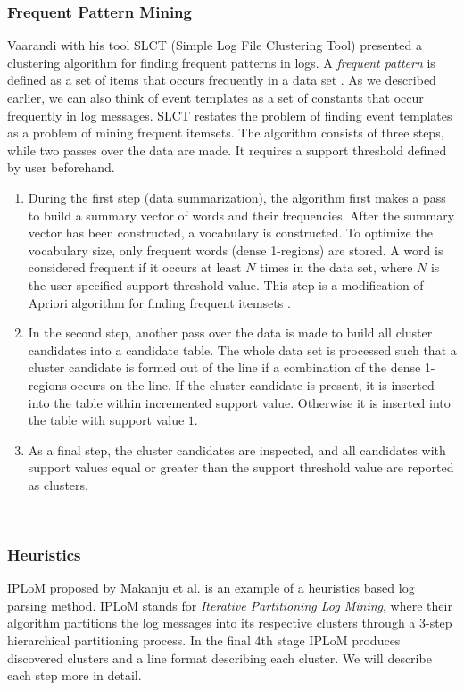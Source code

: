     \subsubsection*{Frequent Pattern Mining} 
    Vaarandi with his tool SLCT (Simple Log File Clustering Tool) \cite{vaarandi2003} presented a clustering algorithm for finding frequent patterns in logs. A \textit{frequent pattern} is defined as a set of items that occurs frequently in a data set \cite{zhlhxzl2018}. As we described earlier, we can also think of event templates as a set of constants that occur frequently in log messages. SLCT restates the problem of finding event templates as a problem of mining frequent itemsets. The algorithm consists of three steps, while two passes over the data are made. It requires a support threshold defined by user beforehand.
   
    \begin{enumerate}
       \item During the first step (data summarization), the algorithm first makes a pass to build a summary vector of words and their frequencies. After the summary vector has been constructed, a vocabulary is constructed. To optimize the vocabulary size, only frequent words (dense 1-regions) are stored. A word is considered frequent if it occurs at least $N$ times in the data set, where $N$ is the user-specified support threshold value. This step is a modification of Apriori algorithm for finding frequent itemsets \cite{Agrawal94fastalgorithms}. 
       
       \item In the second step, another pass over the data is made to build all cluster candidates into a candidate table. The whole data set is processed such that a cluster candidate is formed out of the line if a combination of the dense 1-regions occurs on the line. If the cluster candidate is present, it is inserted into the table within incremented support value. Otherwise it is inserted into the table with support value $1$.  
       
       \item As a final step, the cluster candidates are inspected, and all candidates with support values equal or greater than the support threshold value are reported as clusters. 
   \end{enumerate} \\
   
    
    \subsubsection*{Heuristics}
    IPLoM proposed by Makanju et al. \cite{Makanju2009ALA} is an example of a heuristics based log parsing method. IPLoM stands for \textit{Iterative Partitioning Log Mining}, where their algorithm partitions the log messages into its respective clusters through a 3-step hierarchical partitioning process. In the final 4th stage IPLoM produces discovered clusters and a line format describing each cluster. We will describe each step more in detail.\\
    
